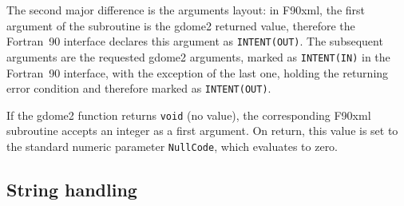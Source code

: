 The second major difference is the arguments layout: in F90xml, the
first argument of the subroutine is the gdome2 returned value, therefore the
{Fortran~90} interface declares this argument as \texttt{INTENT(OUT)}. The
subsequent arguments are the requested gdome2 arguments, marked as
\texttt{INTENT(IN)} in the {Fortran~90} interface, with the
exception of the last one, holding the returning error condition and
therefore marked as \texttt{INTENT(OUT)}. 

If the gdome2 function returns \texttt{void} (no value), the corresponding
F90xml subroutine accepts an integer as a first argument. On return, this
value is set to the standard numeric parameter \texttt{NullCode}, which
evaluates to zero. 

\subsection*{String handling}

